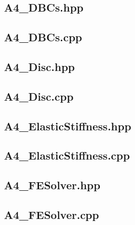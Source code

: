 \documentclass[a4paper, 12pt]{article}
\begin{document}
\newpage
\subsection{A4\_DBCs.hpp} \label{subsec:DBCs.hpp}


\newpage
\subsection{A4\_DBCs.cpp} \label{subsec:DBCs.cpp}


\newpage
\subsection{A4\_Disc.hpp} \label{subsec:Disc.hpp}


\newpage
\subsection{A4\_Disc.cpp} \label{subsec:Disc.cpp}


\newpage
\subsection{A4\_ElasticStiffness.hpp} \label{subsec:ElasticStiffness.hpp}


\newpage
\subsection{A4\_ElasticStiffness.cpp} \label{subsec:ElasticStiffness.cpp}


\newpage
\subsection{A4\_FESolver.hpp} \label{subsec:FESolver.hpp}


\newpage
\subsection{A4\_FESolver.cpp} \label{subsec:FESolver.cpp}

\end{document}
